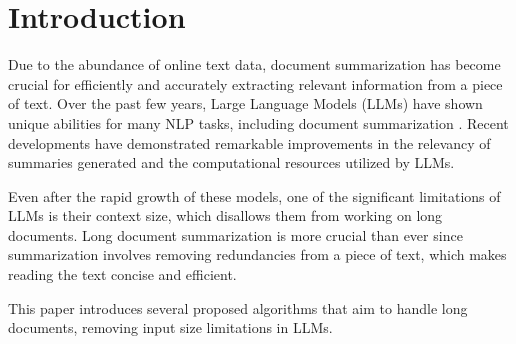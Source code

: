 \section{Introduction}
\label{sec:introduction}

Due to the abundance of online text data, document summarization has become crucial
for efficiently and accurately extracting relevant information from a piece of text.
Over the past few years, Large Language Models (LLMs) have shown unique abilities for
many NLP tasks, including document summarization \cite{yadav2023state}.
Recent developments have demonstrated remarkable improvements in the relevancy of
summaries generated and the computational resources utilized by LLMs.

Even after the rapid growth of these models, one of the significant limitations of
LLMs is their context size, which disallows them from working on long documents.
Long document summarization is more crucial than ever since summarization involves
removing redundancies from a piece of text, which makes reading the text concise and
efficient.

This paper introduces several proposed algorithms that aim to handle long documents,
removing input size limitations in LLMs.
